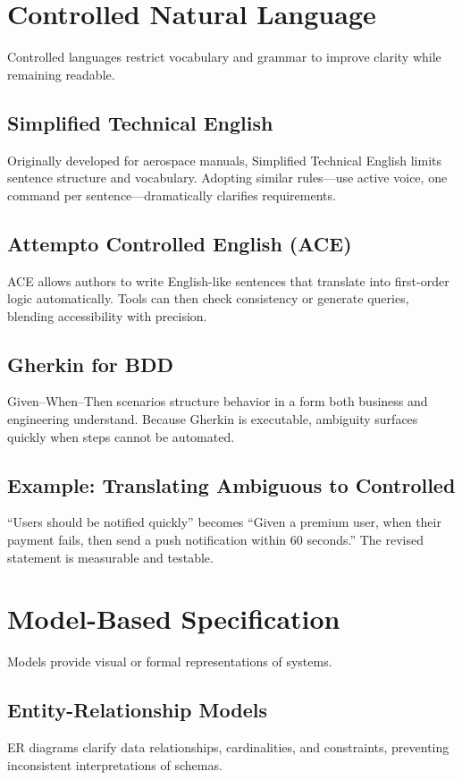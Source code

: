 \section{Controlled Natural Language}
\label{sec:controlled-language}

Controlled languages restrict vocabulary and grammar to improve clarity while remaining readable.

\subsection{Simplified Technical English}
Originally developed for aerospace manuals, Simplified Technical English limits sentence structure and vocabulary. Adopting similar rules—use active voice, one command per sentence—dramatically clarifies requirements.

\subsection{Attempto Controlled English (ACE)}
ACE allows authors to write English-like sentences that translate into first-order logic automatically. Tools can then check consistency or generate queries, blending accessibility with precision.

\subsection{Gherkin for BDD}
Given--When--Then scenarios structure behavior in a form both business and engineering understand. Because Gherkin is executable, ambiguity surfaces quickly when steps cannot be automated.

\subsection{Example: Translating Ambiguous to Controlled}
``Users should be notified quickly'' becomes ``Given a premium user, when their payment fails, then send a push notification within 60 seconds.'' The revised statement is measurable and testable.

\section{Model-Based Specification}
\label{sec:model-based}

Models provide visual or formal representations of systems.

\subsection{Entity-Relationship Models}
ER diagrams clarify data relationships, cardinalities, and constraints, preventing inconsistent interpretations of schemas.

